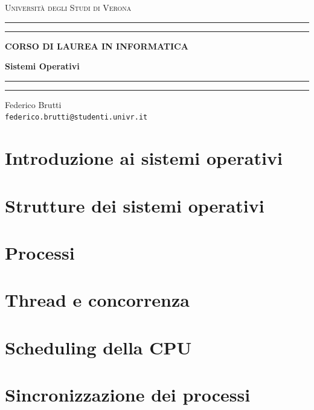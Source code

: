 \documentclass[12pt,a4paper,oneside]{book}
\begin{document}
	
	\begin{titlepage}
		\begin{center}
			{{\LARGE{\textsc{Università degli Studi di Verona}}}} \rule[0.1cm]{15.8cm}{0.1mm}
			\rule[0.5cm]{15.8cm}{0.6mm}
			{\small{\bf CORSO DI LAUREA IN INFORMATICA}}
		\end{center}
		\vspace{12.5mm}
		
		\begin{center}
			{\Huge{\bf Sistemi Operativi}}
		\end{center}
		\vspace{130mm}
		
		\begin{minipage}[l]{1.8mm}
			\rule[0.1cm]{0.1mm}{2cm}
			\rule[0.1cm]{0.6mm}{2cm}
		\end{minipage}
		\hspace{2mm}
		\begin{minipage}{10cm}	
			{\large{Federico Brutti\\
			\texttt{federico.brutti@studenti.univr.it}}}
		\end{minipage}
	\end{titlepage}
	
	\blankpage
	\tableofcontents
	
	\chapter{Introduzione ai sistemi operativi}
	
	\chapter{Strutture dei sistemi operativi}
	
	\chapter{Processi}
	
	\chapter{Thread e concorrenza}
	
	\chapter{Scheduling della CPU}
	
	\chapter{Sincronizzazione dei processi}
	
\end{document}
